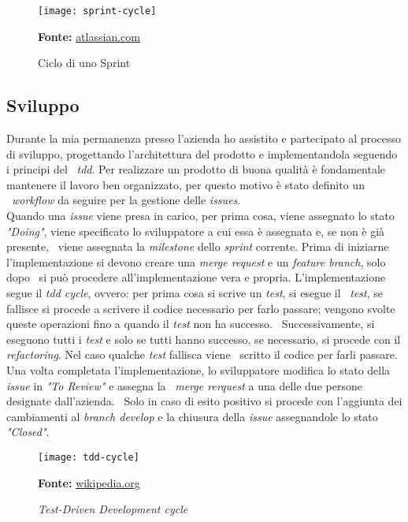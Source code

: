 \begin{figure}[!ht]
  \begin{center}
    \texttt{[image: sprint-cycle]}
    \caption{Ciclo di uno Sprint}
    \textbf{Fonte:} \href{https://www.atlassian.com}{atlassian.com}
  \end{center}
\end{figure}

\subsection{Sviluppo}
Durante la mia permanenza presso l'azienda ho assistito e partecipato al processo di sviluppo, progettando l'architettura del prodotto e implementandola seguendo i principi del \
\emph{\acrfull{tdd}}. Per realizzare un prodotto di buona qualità è fondamentale mantenere il lavoro ben organizzato, per questo motivo è stato definito un \
\emph{workflow} da seguire per la gestione delle \emph{issues}. \\

Quando una \emph{issue} viene presa in carico, per prima cosa, viene assegnato lo stato \emph{"Doing"}, viene specificato lo sviluppatore a cui essa è assegnata e, se non è già presente, \
viene assegnata la \emph{milestone} dello \emph{sprint} corrente. Prima di iniziarne l'implementazione si devono creare una \emph{merge request} e un \emph{feature branch}, solo dopo \
si può procedere all'implementazione vera e propria. L'implementazione segue il \emph{\acrlong{tdd} cycle}, ovvero: per prima cosa si scrive un \emph{test}, si esegue il \
\emph{test}, se fallisce si procede a scrivere il codice necessario per farlo passare; vengono svolte queste operazioni fino a quando il \emph{test} non ha successo. \
Successivamente, si eseguono tutti i \emph{test} e solo se tutti hanno successo, se necessario, si procede con il \emph{refactoring}. Nel caso qualche \emph{test} fallisca viene \
scritto il codice per farli passare.
Una volta completata l'implementazione, lo sviluppatore modifica lo stato della \emph{issue} in \emph{"To Review"} e assegna la \
\emph{merge rerquest} a una delle due persone designate dall'azienda. \
Solo in caso di esito positivo si procede con l'aggiunta dei cambiamenti al \emph{branch develop} e la chiusura della \emph{issue} assegnandole lo stato \emph{"Closed"}.

\begin{figure}[!ht]
  \begin{center}
    \texttt{[image: tdd-cycle]}
    \caption{\emph{Test-Driven Development cycle}}
    \textbf{Fonte:} \href{https://www.wikipedia.org}{wikipedia.org}
  \end{center}
\end{figure}


